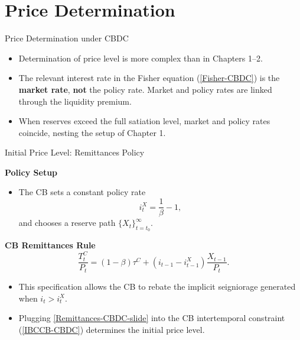 \documentclass[11pt,aspectratio=169]{beamer}
\begin{document}
\section{Price Determination}

\begin{frame}{Price Determination under CBDC}
\begin{itemize}
    \item Determination of price level is more complex than in Chapters 1–2.
    \vspace{0.4em}
    \item The relevant interest rate in the Fisher equation (\ref{Fisher-CBDC}) is the \textbf{market rate}, \textbf{not} the policy rate. Market and policy rates are linked through the liquidity premium.
    \vspace{0.4em}
    \item When reserves exceed the full satiation level, market and policy rates coincide, nesting the setup of Chapter 1.
\end{itemize}
\end{frame}


\begin{frame}{Initial Price Level: Remittances Policy}
\small

\textbf{Policy Setup}
\begin{itemize}
    \item The CB sets a constant policy rate  
    \[
      i_t^X = \frac{1}{\beta} - 1,
    \]
    and chooses a reserve path $\{X_t\}_{t=t_0}^{\infty}$.
\end{itemize}

\vspace{0.25cm}

\textbf{CB Remittances Rule}
\begin{equation} \label{Remittances-CBDC-slide}
\frac{T_t^C}{P_t} 
= (1-\beta)\tau^C 
+ (i_{t-1} - i_{t-1}^X)\frac{X_{t-1}}{P_t}.
\end{equation}

\begin{itemize}
    \item This specification allows the CB to rebate the implicit seigniorage generated when $i_t > i_t^X$.
    \item Plugging \eqref{Remittances-CBDC-slide} into the CB intertemporal constraint (\ref{IBCCB-CBDC}) determines the initial price level.
\end{itemize}

\end{frame}
\end{document}
